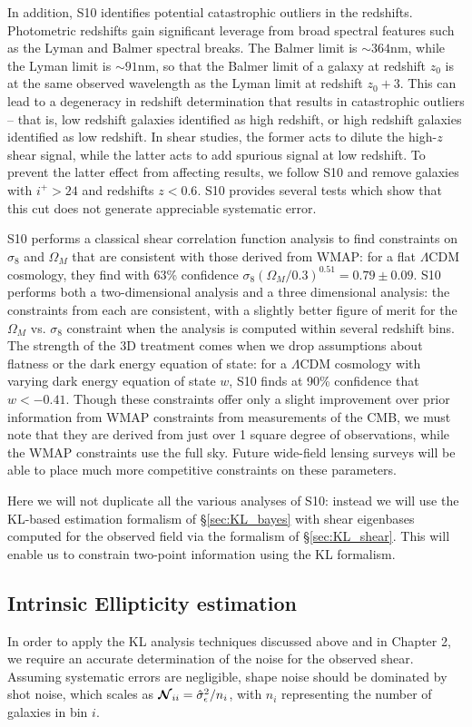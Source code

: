 In addition, S10 identifies potential catastrophic outliers in the redshifts.
Photometric redshifts gain significant leverage from broad spectral features
such as the Lyman and Balmer spectral breaks.  The Balmer limit is
$\sim 364$nm, while the Lyman limit is $\sim 91$nm, so that the Balmer limit
of a galaxy at redshift $z_0$ is at the same observed wavelength as the
Lyman limit at redshift $z_0 + 3$.  This can lead to a degeneracy in redshift
determination that results in catastrophic outliers -- that is, low redshift
galaxies identified as high redshift, or high redshift galaxies identified as
low redshift.  In shear studies, the former acts to dilute the high-$z$
shear signal,
while the latter acts to add spurious signal at low redshift.  To prevent
the latter effect from affecting results, we follow S10 and remove galaxies
with $i^+ > 24$ and redshifts $z < 0.6$.  S10 provides several tests which
show that this cut does not generate appreciable systematic error.

S10 performs a classical shear correlation function analysis to find
constraints on $\sigma_8$ and $\Omega_M$ that are consistent with
those derived from WMAP: for a flat $\Lambda$CDM cosmology, they
find with 63\% confidence 
$\sigma_8(\Omega_M / 0.3)^{0.51} = 0.79 \pm 0.09$.  S10 performs both a
two-dimensional analysis and a three dimensional analysis: the constraints
from each are consistent, with a slightly better figure of merit for the
$\Omega_M$ vs. $\sigma_8$ constraint when the analysis is computed within
several redshift bins.  The strength of the
3D treatment comes when we drop assumptions about flatness or the dark
energy equation of state: for a
$\Lambda$CDM cosmology with varying dark energy equation of state $w$,
S10 finds at 90\% confidence that $w < -0.41$.
Though these constraints offer only a slight improvement over prior
information from WMAP constraints from measurements of the CMB, we must
note that they are derived from just over
1 square degree of observations, while the
WMAP constraints use the full sky.  Future wide-field
lensing surveys will be able to place much more competitive constraints
on these parameters.

Here we will not duplicate all the various analyses of S10: instead we
will use the KL-based estimation formalism of \S\ref{sec:KL_bayes} with
shear eigenbases computed for the observed field via the formalism
of \S\ref{sec:KL_shear}.  This will enable us to constrain two-point
information using the KL formalism.

\subsection{Intrinsic Ellipticity estimation}
\label{sec:bootstrap}
In order to apply the KL analysis techniques discussed
above and in Chapter 2, we require an accurate
determination of the noise for the observed shear.  Assuming systematic
errors are negligible, shape noise should be dominated by shot noise,
which scales as $\boldsymbol{\mathcal{N}}_{ii} = \hat{\sigma}_\epsilon^2 / n_i$,
with $n_i$ representing the number of galaxies in bin $i$.

